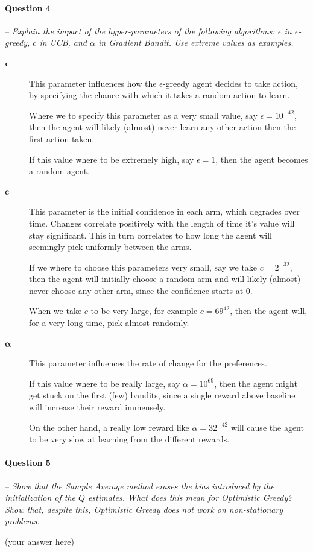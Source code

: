 \documentclass[a4paper]{article}
\newcommand{\question}[2]{
\paragraph{Question #1} -- \textit{#2}

}
\begin{document}
		\question{4}{Explain the impact of the hyper-parameters of the following algorithms: $\epsilon$ in $\epsilon$-greedy, $c$ in UCB, and $\alpha$ in Gradient Bandit. 
				Use extreme values as examples.}
			\begin{description}
				\item [$\boldsymbol{\epsilon}$] 
					This parameter influences how the $\epsilon$-greedy agent decides to take action, by specifying the chance with which it takes a random action to learn.

					Where we to specify this parameter as a very small value, say $\epsilon = 10^{-42}$, then the agent will likely (almost) never learn any other action then the first action taken.

					If this value where to be extremely high, say $\epsilon = 1$, then the agent becomes a random agent.
				\item [$\boldsymbol{c}$] 
					This parameter is the initial confidence in each arm, which degrades over time.  
					Changes correlate positively with the length of time it's value will stay significant.  
					This in turn correlates to how long the agent will seemingly pick uniformly between the arms.

					If we where to choose this parameters very small, say we take $c = 2^{-32}$, then the agent will initially choose a random arm and will likely (almost) never choose any other arm, since the confidence starts at 0.

					When we take $c$ to be very large, for example $c = 69^{42}$, then the agent will, for a very long time, pick almost randomly.
				\item [$\boldsymbol{\alpha}$]
					This parameter influences the rate of change for the preferences.

					If this value where to be really large, say $\alpha = 10^{69}$, then the agent might get stuck on the first (few) bandits, since a single reward above baseline will increase their reward immensely.

					On the other hand, a really low reward like $\alpha = 32^{-42}$ will cause the agent to be very slow at learning from the different rewards.
			\end{description}

		\question{5}{Show that the Sample Average method erases the bias introduced by the initialization of the $Q$ estimates. 
				What does this mean for Optimistic Greedy? Show that, despite this, Optimistic Greedy does not work on non-stationary problems.}
			(your answer here)
\end{document}
